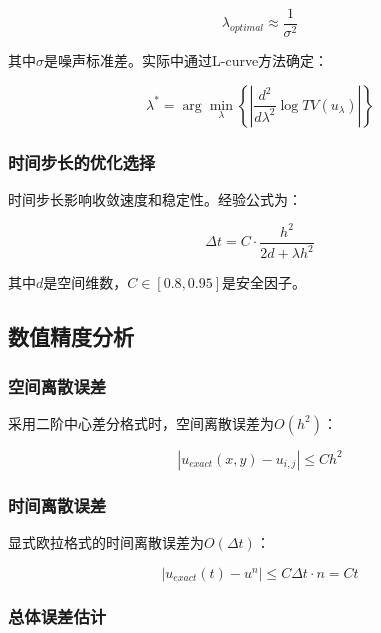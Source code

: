 \documentclass[a4paper,12pt]{ctexart}
\begin{document}
\begin{equation}
\lambda_{optimal} \approx \frac{1}{\sigma^2}
\end{equation}

其中$\sigma$是噪声标准差。实际中通过L-curve方法确定：

\begin{equation}
\lambda^* = \arg\min_\lambda \left\{ \left|\frac{d^2}{d\lambda^2} \log TV(u_\lambda)\right| \right\}
\end{equation}

\subsubsection{时间步长的优化选择}

时间步长影响收敛速度和稳定性。经验公式为：

\begin{equation}
\Delta t = C \cdot \frac{h^2}{2d + \lambda h^2}
\end{equation}

其中$d$是空间维数，$C \in [0.8, 0.95]$是安全因子。

\subsection{数值精度分析}

\subsubsection{空间离散误差}

采用二阶中心差分格式时，空间离散误差为$O(h^2)$：

\begin{equation}
\left|u_{exact}(x,y) - u_{i,j}\right| \leq C h^2
\end{equation}

\subsubsection{时间离散误差}

显式欧拉格式的时间离散误差为$O(\Delta t)$：

\begin{equation}
\left|u_{exact}(t) - u^n\right| \leq C \Delta t \cdot n = C t
\end{equation}

\subsubsection{总体误差估计}
\end{document}
